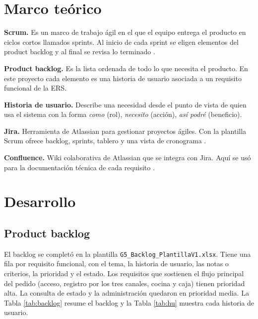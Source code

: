 \documentclass[a4paper, 11pt]{article}
\begin{document}
\section{Marco teórico}

\textbf{Scrum.} Es un marco de trabajo ágil en el que el equipo entrega el producto en ciclos cortos llamados sprints. Al inicio de cada sprint se eligen elementos del product backlog y al final se revisa lo terminado \cite{scrumguide}.

\textbf{Product backlog.} Es la lista ordenada de todo lo que necesita el producto. En este proyecto cada elemento es una historia de usuario asociada a un requisito funcional de la ERS.

\textbf{Historia de usuario.} Describe una necesidad desde el punto de vista de quien usa el sistema con la forma \textit{como} (rol), \textit{necesito} (acción), \textit{así podré} (beneficio).

\textbf{Jira.} Herramienta de Atlassian para gestionar proyectos ágiles. Con la plantilla Scrum ofrece backlog, sprints, tablero y una vista de cronograma \cite{jira}.

\textbf{Confluence.} Wiki colaborativa de Atlassian que se integra con Jira. Aquí se usó para la documentación técnica de cada requisito \cite{confluence}.

\section{Desarrollo}

\subsection{Product backlog}

El backlog se completó en la plantilla \texttt{G5\_Backlog\_PlantillaV1.xlsx}. Tiene una fila por requisito funcional, con el tema, la historia de usuario, las notas o criterios, la prioridad y el estado. Los requisitos que sostienen el flujo principal del pedido (acceso, registro por los tres canales, cocina y caja) tienen prioridad alta. La consulta de estado y la administración quedaron en prioridad media. La Tabla \ref{tab:backlog} resume el backlog y la Tabla \ref{tab:hu} muestra cada historia de usuario.
\end{document}
